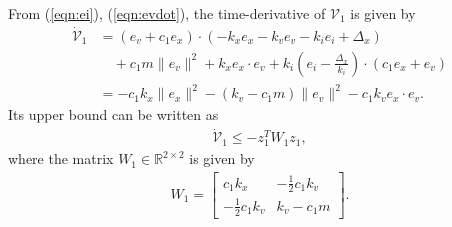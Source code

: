 \documentclass[twocolumn,letterpaper]{IEEEAerospaceCLS}  %
\newcommand{\refeqn}[1]{(\ref{eqn:#1})}
\renewcommand{\Re}{\mathbb{R}}
\begin{document}
From \refeqn{ei}, \refeqn{evdot}, the time-derivative of ${\mathcal{V}}_1$ is given by
\begin{align*}
\dot{\mathcal{V}}_1 & = (e_v+c_1e_x)\cdot (-k_xe_x -k_ve_v-k_ie_i+\Delta_x) \\
&\quad + c_1m \|e_v\|^2 + k_x e_x\cdot e_v +k_i(e_i-\frac{\Delta_x}{k_i})\cdot(c_1e_x+e_v)\\
& = -c_1k_x\|e_x\|^2 -(k_v-c_1m)\|e_v\|^2 -c_1 k_v e_x\cdot e_v. 
\end{align*}
Its upper bound can be written as
\begin{align}
\dot{\mathcal{V}}_1 \leq -z_1^T W_1 z_1, 
\end{align}
where the matrix $W_1\in{\Re}^{2\times 2}$ is given by
\begin{align}
W_1 = \begin{bmatrix} c_1k_x & -\frac{1}{2}c_1 k_v \\
-\frac{1}{2}c_1 k_v & k_v-c_1m
\end{bmatrix}.\label{eqn:W1}
\end{align}
\end{document}
